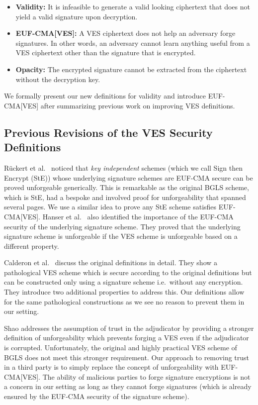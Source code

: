 \documentclass[fullpage]{article}
\theoremstyle{definition}
\newcommand{\EUFCMA}{\textsf{EUF-CMA}\xspace}
\newcommand{\EUFCMAVES}{\textsf{EUF-CMA}[\textsf{VES}]\xspace}
\begin{document}
\begin{itemize}
    \item \textbf{Validity:} It is infeasible to generate a valid looking ciphertext that does not yield a valid signature upon decryption.
    \item \textbf{\EUFCMAVES:} A VES ciphertext does not help an adversary forge signatures. In other words, an adversary cannot learn anything useful from a VES ciphertext other than the signature that is encrypted.
    \item \textbf{Opacity:} The encrypted signature cannot be extracted from the ciphertext without the decryption key.
\end{itemize}


We formally present our new definitions for validity and introduce \EUFCMAVES after summarizing previous work on improving VES definitions.

\subsection{Previous Revisions of the VES Security Definitions}

Rückert et al.\ \cite{Ruckert:2009:SVE:1615384.1615387} noticed that \emph{key independent} schemes (which we call Sign then Encrypt (StE)) whose underlying signature schemes are \EUFCMA secure can be proved unforgeable generically. This is remarkable as the original BGLS scheme, which is StE, had a bespoke and involved proof for unforgeability that spanned several pages. We use a similar idea to prove any StE scheme satisfies \EUFCMAVES\@. Hanser et al.\ \cite{VES-structure-preserving} also identified the importance of the \EUFCMA security of the underlying signature scheme. They proved that the underlying signature scheme is unforgeable if the VES scheme is unforgeable based on a different property.

Calderon et al.\ \cite{calderon2014rethinking} discuss the original definitions in detail. They show a pathological VES scheme which is secure according to the original definitions but can be constructed only using a signature scheme i.e.\ without any encryption. They introduce two additional properties to address this. Our definitions allow for the same pathological constructions as we see no reason to prevent them in our setting.

Shao \cite{SHAO20081961} addresses the assumption of trust in the adjudicator by providing a stronger definition of unforgeability which prevents forging a VES even if the adjudicator is corrupted. Unfortunately, the original and highly practical VES scheme of BGLS does not meet this stronger requirement. Our approach to removing trust in a third party is to simply replace the concept of unforgeability with \EUFCMAVES\@. The ability of malicious parties to forge signature encryptions is not a concern in our setting as long as they cannot forge signatures (which is already ensured by the \EUFCMA security of the signature scheme).
\end{document}
